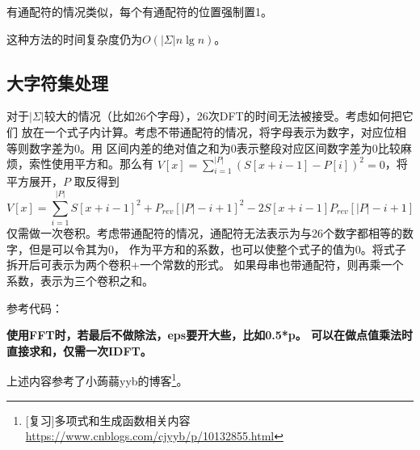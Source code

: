 有通配符的情况类似，每个有通配符的位置强制置1。

这种方法的时间复杂度仍为$O(|\Sigma|n\lg n)$。
\subsection{大字符集处理}
对于$|\Sigma|$较大的情况（比如26个字母），26次DFT的时间无法被接受。考虑如何把它们
放在一个式子内计算。考虑不带通配符的情况，将字母表示为数字，对应位相等则数字差为0。用
区间内差的绝对值之和为0表示整段对应区间数字差为0比较麻烦，索性使用平方和。那么有
$V[x]=\displaystyle \sum_{i=1}^{|P|}{(S[x+i-1]-P[i])^2}=0$，将平方展开，$P$
取反得到
\begin{displaymath}
    V[x]=\displaystyle \sum_{i=1}^{|P|}{S[x+i-1]^2+P_{rev}[|P|-i+1]^2-2S[x+i-1]P_{rev}[|P|-i+1]}
\end{displaymath}
仅需做一次卷积。考虑带通配符的情况，通配符无法表示为与26个数字都相等的数字，但是可以令其为0，
作为平方和的系数，也可以使整个式子的值为0。将式子拆开后可表示为两个卷积+一个常数的形式。
如果母串也带通配符，则再乘一个系数，表示为三个卷积之和。

参考代码：


{\bfseries 使用FFT时，若最后不做除法，eps要开大些，比如0.5*p。
可以在做点值乘法时直接求和，仅需一次IDFT。}

上述内容参考了小蒟蒻yyb的博客\footnote{
    [复习]多项式和生成函数相关内容
    \url{https://www.cnblogs.com/cjyyb/p/10132855.html}
}。
